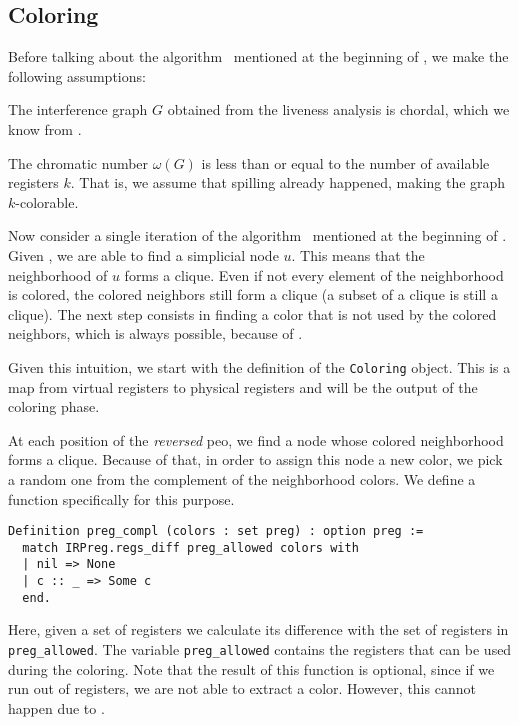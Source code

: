 \subsection{Coloring}
\label{subsec:coloring}

Before talking about the algorithm~\cite{HGG:2006:RA-SSA} mentioned at the beginning of , we make the following assumptions:

\begin{assumption}\label{ass:ig1}
The interference graph $G$ obtained from the liveness analysis is chordal, which we know from .
\end{assumption}

\begin{assumption}\label{ass:ig2}
The chromatic number $\omega(G)$ is less than or equal to the number of available registers $k$. That is, we assume that spilling already happened, making the graph $k$-colorable.
\end{assumption}

Now consider a single iteration of the algorithm~\cite{HGG:2006:RA-SSA} mentioned at the beginning of . Given , we are able to find a simplicial node $u$. This means that the neighborhood of $u$ forms a clique. Even if not every element of the neighborhood is colored, the colored neighbors still form a clique (a subset of a clique is still a clique). The next step consists in finding a color that is not used by the colored neighbors, which is always possible, because of .

Given this intuition, we start with the definition of the \texttt{Coloring} object. This is a map from virtual registers to physical registers and will be the output of the coloring phase.

At each position of the \textit{reversed} \gls{peo}, we find a node whose colored neighborhood forms a clique. Because of that, in order to assign this node a new color, we pick a random one from the complement of the neighborhood colors. We define a function specifically for this purpose.

\begin{lstlisting}[style=Rocq]
Definition preg_compl (colors : set preg) : option preg :=
  match IRPreg.regs_diff preg_allowed colors with
  | nil => None
  | c :: _ => Some c
  end.
\end{lstlisting}

Here, given a set of registers we calculate its difference with the set of registers in \texttt{preg\_allowed}. The variable \texttt{preg\_allowed} contains the registers that can be used during the coloring. Note that the result of this function is optional, since if we run out of registers, we are not able to extract a color. However, this cannot happen due to .

